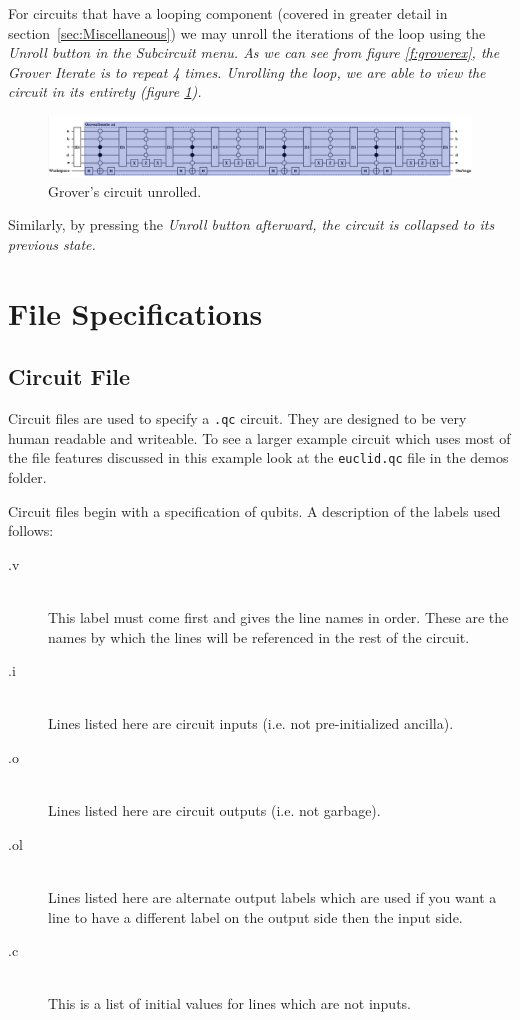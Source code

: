 \documentclass[10pt]{article}
\theoremstyle{definition}
\begin{document}
For circuits that have a looping component (covered in greater detail in section~\ref{sec:Miscellaneous}) we may unroll the iterations of the loop using the \em Unroll \em button in the \em Subcircuit \em menu. As we can see from figure \ref{f:groverex}, the Grover Iterate is to repeat 4 times. Unrolling the loop, we are able to view the circuit in its entirety (figure \ref{f:groverunroll}).

\begin{figure}
\capstart
\centering
\includegraphics[width=170mm]{Figures/SubCircuits/GroverCircuitUnroll}
\caption{Grover's circuit unrolled.}
\label{f:groverunroll}
\end{figure}

Similarly, by pressing the \em Unroll \em button afterward, the circuit is collapsed to its previous state. 

\section{File Specifications}

\subsection{Circuit File}
Circuit files are used to specify a \verb+.qc+ circuit. They are designed to be very human readable and
writeable.  To see a larger example circuit which uses most of the file features discussed in this example
look at the \verb+euclid.qc+ file in the demos folder.

Circuit files begin with a specification of qubits. A description of the labels used follows:
\begin{description}
\item[.v] \hfill \\
This label must come first and gives the line names in order.  These are the names by which the lines
will be referenced in the rest of the circuit.
\item[.i] \hfill \\
Lines listed here are circuit inputs (i.e. not pre-initialized ancilla).
\item[.o] \hfill \\
Lines listed here are circuit outputs (i.e. not garbage).
\item[.ol] \hfill \\
Lines listed here are alternate output labels which are used if you want a 
line to have a different label on the output side then the input side.
\item[.c] \hfill \\
This is a list of initial values for lines which are not inputs.
\end{description}
\end{document}
